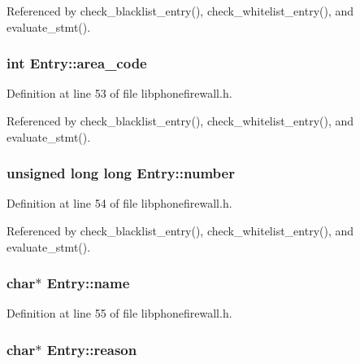 Referenced by check\_\-blacklist\_\-entry(), check\_\-whitelist\_\-entry(), and evaluate\_\-stmt().\hypertarget{structEntry_9de7b96e5b65796bd35e9dc730dcd8b3}{
\subsubsection{\setlength{\rightskip}{0pt plus 5cm}int {\bf Entry::area\_\-code}}}
\label{structEntry_9de7b96e5b65796bd35e9dc730dcd8b3}




Definition at line 53 of file libphonefirewall.h.

Referenced by check\_\-blacklist\_\-entry(), check\_\-whitelist\_\-entry(), and evaluate\_\-stmt().\hypertarget{structEntry_1f2177afed89936f82c130ae13fb107c}{
\subsubsection{\setlength{\rightskip}{0pt plus 5cm}unsigned long long {\bf Entry::number}}}
\label{structEntry_1f2177afed89936f82c130ae13fb107c}




Definition at line 54 of file libphonefirewall.h.

Referenced by check\_\-blacklist\_\-entry(), check\_\-whitelist\_\-entry(), and evaluate\_\-stmt().\hypertarget{structEntry_272e382d3efed5f970c7939742ec9603}{
\subsubsection{\setlength{\rightskip}{0pt plus 5cm}char$\ast$ {\bf Entry::name}}}
\label{structEntry_272e382d3efed5f970c7939742ec9603}




Definition at line 55 of file libphonefirewall.h.\hypertarget{structEntry_2082cdbb815dfa8b81309cd395d32986}{
\subsubsection{\setlength{\rightskip}{0pt plus 5cm}char$\ast$ {\bf Entry::reason}}}
\label{structEntry_2082cdbb815dfa8b81309cd395d32986}




